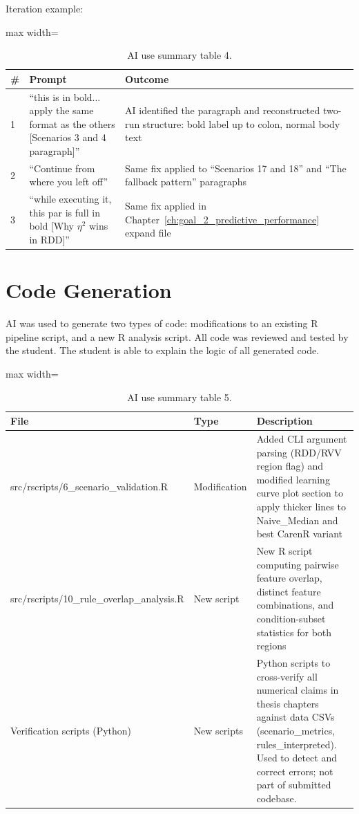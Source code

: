 Iteration example:

\begin{table}[htbp]
  \centering
  \caption{AI use summary table 4.}\label{tab:appe_4}
  \footnotesize
  \begin{adjustbox}{max width=\textwidth}
    \begin{tabularx}{\textwidth}{p{0.4cm}|p{5.0cm}|X}
  \toprule
  \# & Prompt & Outcome \\
  \midrule
  1 & ``this is in bold... apply the same format as the others [Scenarios 3 and 4 paragraph]'' & AI identified the paragraph and reconstructed two-run structure: bold label up to colon, normal body text \\
  2 & ``Continue from where you left off'' & Same fix applied to “Scenarios 17 and 18” and “The fallback pattern” paragraphs \\
  3 & ``while executing it, this par is full in bold [Why $\eta$$^2$ wins in RDD]'' & Same fix applied in Chapter~\ref{ch:goal_2_predictive_performance} expand file \\
  \bottomrule
\end{tabularx}
  \end{adjustbox}

\end{table}


\section{Code Generation}\label{app_sec:code_generation}

AI was used to generate two types of code: modifications to an existing R pipeline script, and a new R analysis script. All code was reviewed and tested by the student. The student is able to explain the logic of all generated code.

\begin{table}[htbp]
  \centering
  \caption{AI use summary table 5.}\label{tab:appe_5}
  \footnotesize
  \begin{adjustbox}{max width=\textwidth}
    \begin{tabularx}{\textwidth}{p{4.5cm}|p{2.0cm}|X}
  \toprule
  File & Type & Description \\
  \midrule
  src/rscripts/6\_scenario\_validation.R & Modification & Added CLI argument parsing (RDD/RVV region flag) and modified learning curve plot section to apply thicker lines to Naive\_Median and best CarenR variant \\
  src/rscripts/10\_rule\_overlap\_analysis.R & New script & New R script computing pairwise feature overlap, distinct feature combinations, and condition-subset statistics for both regions \\
  Verification scripts (Python) & New scripts & Python scripts to cross-verify all numerical claims in thesis chapters against data CSVs (scenario\_metrics, rules\_interpreted). Used to detect and correct errors; not part of submitted codebase. \\
  \bottomrule
\end{tabularx}
  \end{adjustbox}

\end{table}

